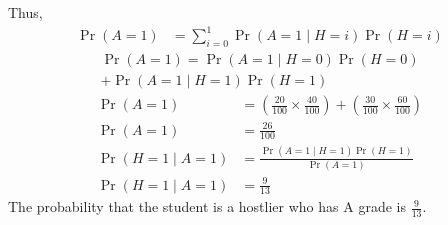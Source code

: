 \documentclass[12pt,twocolumn]{article}
\providecommand{\pr}[1]{\ensuremath{\Pr\left(#1\right)}}
\begin{document}
Thus,
\begin{align}
	\pr{A=1} &= \sum_{i=0}^1 \pr{A = 1 \mid H = i}\pr{H=i}
\end{align}
\begin{multline}
	\pr{A=1} = \pr{A = 1 \mid H = 0}\pr{H = 0}\\
	+\pr{A = 1 \mid H = 1}\pr{H = 1}
\end{multline}
\begin{align}
	\pr{A=1} &= \left(\frac{20}{100} \times \frac{40}{100}\right)+\left(\frac{30}{100} \times \frac{60}{100}\right)\\
	\pr{A=1} &= \frac{26}{100}\\
	\pr{H=1 \mid A=1} &= \frac{\pr{A=1 \mid H=1}\pr{H=1}}{\pr{A=1}}\\
	\pr{H=1 \mid A=1} &= \frac{9}{13}
\end{align}
The probability that the student is a hostlier who has A grade is $\frac{9}{13}$.
\end{document}
